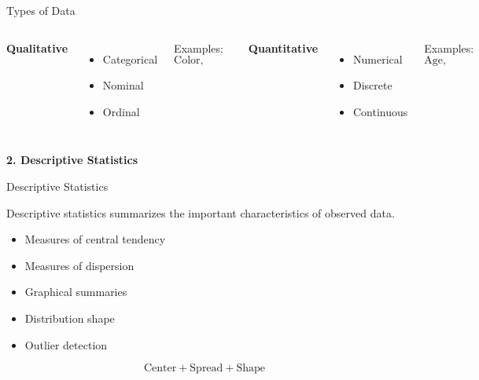 \documentclass[aspectratio=169,11pt]{beamer}
\begin{document}
\begin{frame}{Types of Data}

\begin{columns}[T]

\textbf{Qualitative}
\begin{itemize}
    \item Categorical
    \item Nominal
    \item Ordinal
\end{itemize}

Examples:
\[
\text{Color, Grade, Department}
\]

\textbf{Quantitative}
\begin{itemize}
    \item Numerical
    \item Discrete
    \item Continuous
\end{itemize}

Examples:
\[
\text{Age, Height, Number of Students}
\]

\end{columns}
\end{frame}


\begin{frame}
\centering
\vfill
{\Huge\color{CUSATblue}\textbf{2. Descriptive Statistics}}
\vfill
\end{frame}

\begin{frame}{Descriptive Statistics}

Descriptive statistics summarizes the important characteristics of observed data.

\begin{itemize}
    \item Measures of central tendency
    \item Measures of dispersion
    \item Graphical summaries
    \item Distribution shape
    \item Outlier detection
\end{itemize}

\vspace{0.4cm}

\[
\boxed{\text{Center}+\text{Spread}+\text{Shape}}
\]

\end{frame}
\end{document}
